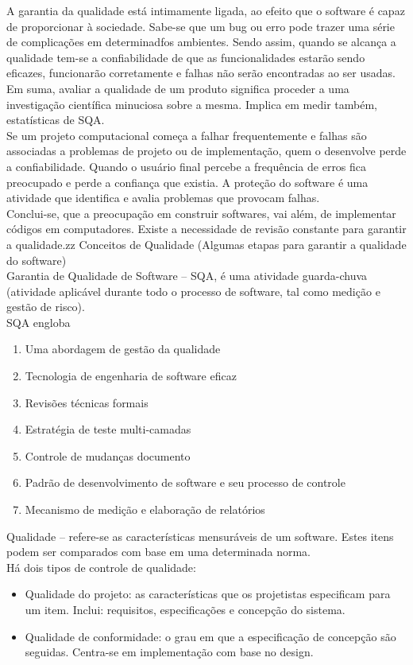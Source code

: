 \documentclass[12pt]{article}
\begin{document}
        A garantia da qualidade está intimamente ligada, ao efeito que o software é capaz de proporcionar à sociedade. Sabe-se que um bug ou erro pode trazer uma série de complicações em determinadfos ambientes.  Sendo assim, quando se alcança a qualidade tem-se a confiabilidade de que as funcionalidades estarão sendo eficazes, funcionarão corretamente e falhas não serão encontradas ao ser usadas. Em suma, avaliar a qualidade de um produto significa proceder a uma investigação científica minuciosa sobre a mesma. Implica em medir também, estatísticas de SQA.\\
        Se um projeto computacional começa a falhar frequentemente e falhas são associadas a problemas de projeto ou de implementação, quem o desenvolve perde a confiabilidade. Quando o usuário final percebe a frequência de erros fica preocupado e perde a confiança que existia. A proteção do software é uma atividade que identifica e avalia problemas que provocam falhas.\\
        Conclui-se, que a preocupação em construir softwares, vai além, de implementar códigos em computadores. Existe a necessidade de revisão constante para garantir a qualidade.zz
        Conceitos de Qualidade (Algumas etapas para garantir a qualidade do software)\\
        Garantia de Qualidade de Software – SQA, é uma atividade guarda-chuva (atividade aplicável durante todo o processo de software, tal como medição e gestão de risco). \\
        SQA engloba 
        \begin{enumerate}
            \item Uma abordagem de gestão da qualidade 
            \item Tecnologia de engenharia de software eficaz 
            \item Revisões técnicas formais 
            \item Estratégia de teste multi-camadas 
            \item Controle de mudanças documento 
            \item Padrão de desenvolvimento de software e seu processo de controle 
            \item Mecanismo de medição e elaboração de relatórios 
        \end{enumerate}
    Qualidade – refere-se as características mensuráveis de um software. Estes itens podem ser comparados com base em uma determinada norma.\\
        Há dois tipos de controle de qualidade: \\
        \begin{itemize}
            \item  Qualidade do projeto: as características que os projetistas especificam para um item. Inclui: requisitos, especificações e concepção do sistema. 
            \item Qualidade de conformidade: o grau em que a especificação de concepção são seguidas. Centra-se em implementação com base no design. 
        \end{itemize}
        
\end{document}
